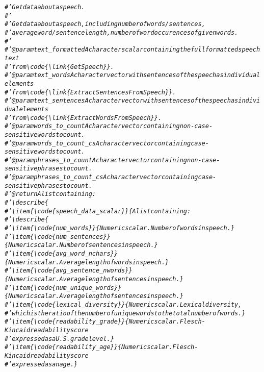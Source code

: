 \documentclass{article}\usepackage[]{graphicx}\usepackage[]{color}
\makeatletter
\newcommand{\hlcom}[1]{\textcolor[rgb]{0.678,0.584,0.686}{\textit{#1}}}%
\newenvironment{kframe}{%
 \def\at@end@of@kframe{}%
 \ifinner\ifhmode%
  \def\at@end@of@kframe{\end{minipage}}%
  \begin{minipage}{\columnwidth}%
 \fi\fi%
 \def\FrameCommand##1{\hskip\@totalleftmargin \hskip-\fboxsep
 \colorbox{shadecolor}{##1}\hskip-\fboxsep
     \hskip-\linewidth \hskip-\@totalleftmargin \hskip\columnwidth}%
 \MakeFramed {\advance\hsize-\width
   \@totalleftmargin\z@ \linewidth\hsize
   \@setminipage}}%
 {\par\unskip\endMakeFramed%
 \at@end@of@kframe}
\newenvironment{knitrout}{}{} %
\makeatother
\begin{document}
\begin{knitrout}
\begin{kframe}
\begin{alltt}
\hlcom{#' Get data about a speech.}
\hlcom{#' }
\hlcom{#' Get data about a speech, including number of words/sentences, }
\hlcom{#' average word/sentence length, number of word occurences of given words.}
\hlcom{#' }
\hlcom{#' @param text_formatted A character scalar containing the full formatted speech text}
\hlcom{#' from \textbackslash{}code\{\textbackslash{}link\{GetSpeech\}\}.}
\hlcom{#' @param text_words A character vector with sentences of the speech as individual elements}
\hlcom{#' from \textbackslash{}code\{\textbackslash{}link\{ExtractSentencesFromSpeech\}\}.}
\hlcom{#' @param text_sentences A character vector with sentences of the speech as individual elements}
\hlcom{#' from \textbackslash{}code\{\textbackslash{}link\{ExtractWordsFromSpeech\}\}.}
\hlcom{#' @param words_to_count A character vector containing non-case-sensitive words to count.}
\hlcom{#' @param words_to_count_cs A character vector containing case-sensitive words to count.}
\hlcom{#' @param phrases_to_count A character vector containing non-case-sensitive phrases to count.}
\hlcom{#' @param phrases_to_count_cs A character vector containing case-sensitive phrases to count.}
\hlcom{#' @return A list containing:}
\hlcom{#' \textbackslash{}describe\{}
\hlcom{#'   \textbackslash{}item\{\textbackslash{}code\{speech_data_scalar\}\}\{A list containing:}
\hlcom{#'     \textbackslash{}describe\{}
\hlcom{#'      \textbackslash{}item\{\textbackslash{}code\{num_words\}\}\{Numeric scalar. Number of words in speech.\}}
\hlcom{#'      \textbackslash{}item\{\textbackslash{}code\{num_sentences\}\}\{Numeric scalar. Number of sentences in speech.\}}
\hlcom{#'      \textbackslash{}item\{\textbackslash{}code\{avg_word_nchars\}\}\{Numeric scalar. Average length of words in speech.\}}
\hlcom{#'      \textbackslash{}item\{\textbackslash{}code\{avg_sentence_nwords\}\}\{Numeric scalar. Average length of sentences in speech.\}}
\hlcom{#'      \textbackslash{}item\{\textbackslash{}code\{num_unique_words\}\}\{Numeric scalar. Average length of sentences in speech.\}}
\hlcom{#'      \textbackslash{}item\{\textbackslash{}code\{lexical_diversity\}\}\{Numeric scalar. Lexical diversity, }
\hlcom{#'      which is the ratio of the number of unique words to the total number of words.\}}
\hlcom{#'      \textbackslash{}item\{\textbackslash{}code\{readability_grade\}\}\{Numeric scalar. Flesch-Kincaid readability score }
\hlcom{#'      expressed as a U.S. grade level.\}}
\hlcom{#'      \textbackslash{}item\{\textbackslash{}code\{readability_age\}\}\{Numeric scalar. Flesch-Kincaid readability score }
\hlcom{#'      expressed as an age.\}}

\end{alltt}
\end{kframe}
\end{knitrout}
\end{document}
